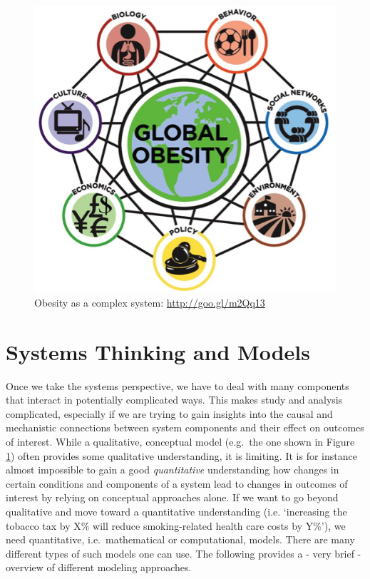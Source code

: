 \documentclass[]{book}
\theoremstyle{definition}
\theoremstyle{definition}
\theoremstyle{definition}
\theoremstyle{remark}
\begin{document}
\begin{figure}
\centering
\includegraphics{./images/complexsystem.png}
\caption{\label{fig:obesitysystem}Obesity as a complex system:
\url{http://goo.gl/m2Qq13}}
\end{figure}

\section{Systems Thinking and Models}\label{systems-thinking-and-models}

Once we take the systems perspective, we have to deal with many
components that interact in potentially complicated ways. This makes
study and analysis complicated, especially if we are trying to gain
insights into the causal and mechanistic connections between system
components and their effect on outcomes of interest. While a
qualitative, conceptual model (e.g.~the one shown in Figure
\ref{fig:obesitysystem}) often provides some qualitative understanding,
it is limiting. It is for instance almost impossible to gain a good
\emph{quantitative} understanding how changes in certain conditions and
components of a system lead to changes in outcomes of interest by
relying on conceptual approaches alone. If we want to go beyond
qualitative and move toward a quantitative understanding (i.e.
`increasing the tobacco tax by X\% will reduce smoking-related health
care costs by Y\%'), we need quantitative, i.e.~mathematical or
computational, models. There are many different types of such models one
can use. The following provides a - very brief - overview of different
modeling approaches.
\end{document}
